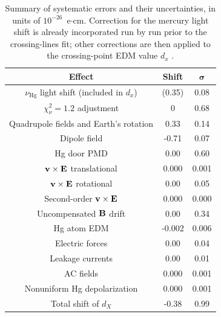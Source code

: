 \begin{table}[h!]
  \begin{center}
    \begin{tabular}{|c||c|c|}
      \hline
      \bf{Effect} & \bf{Shift} & $\boldsymbol{\sigma}$ \\ \hline \hline
      $\nu_{\mathrm{Hg}}$ light shift (included in $d_x$) & (0.35) & 0.08 \\ \hline
      $\chi_{\nu}^2 = 1.2$ adjustment & 0 & 0.68 \\ \hline
      Quadrupole fields and Earth's rotation & 0.33 & 0.14 \\ \hline
      Dipole field & -0.71 & 0.07 \\ \hline
      Hg door PMD & 0.00 & 0.60 \\ \hline
      $\bf{v} \times \bf{E}$ translational & 0.000 & 0.001 \\\hline
      $\bf{v} \times \bf{E}$ rotational & 0.00 & 0.05 \\ \hline
      Second-order $\bf{v} \times \bf{E}$ & 0.000 & 0.000 \\ \hline
      Uncompensated $\bf{B}$ drift & 0.00 & 0.34 \\ \hline
      Hg atom EDM & -0.002 & 0.006 \\ \hline
      Electric forces & 0.00 & 0.04 \\ \hline
      Leakage currents & 0.00 & 0.01 \\ \hline
      AC fields & 0.000 & 0.001 \\ \hline
      Nonuniform Hg depolarization & 0.000 & 0.001 \\ \hline
      Total shift of $d_X$ & -0.38 & 0.99 \\ \hline
    \end{tabular}
  \end{center}
  \caption{\cite{Pendlebury2015}Summary of systematic errors and their
    uncertainties, in units of $10^{-26}$~e$\cdot$cm. Correction for
    the mercury light shift is already incorporated run by run prior
    to the crossing-lines fit; other corrections are then applied to
    the crossing-point EDM value $d_x$ .}
  \label{tab:nedmsystematics}
\end{table}

